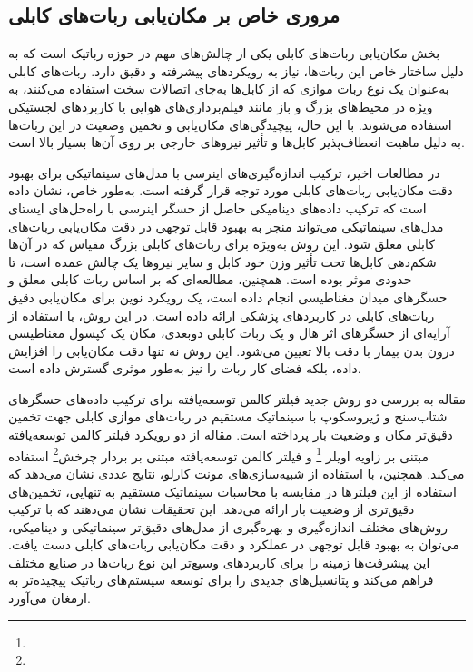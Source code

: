 \subsection{مروری خاص بر مکان‌یابی ربات‌های کابلی}

بخش مکان‌یابی ربات‌های کابلی یکی از چالش‌های مهم در حوزه رباتیک است که به دلیل ساختار خاص این ربات‌ها، نیاز به رویکردهای پیشرفته و دقیق دارد. ربات‌های کابلی به‌عنوان یک نوع ربات موازی که از کابل‌ها به‌جای اتصالات سخت استفاده می‌کنند، به ویژه در محیط‌های بزرگ و باز مانند فیلم‌برداری‌های هوایی یا کاربردهای لجستیکی استفاده می‌شوند. با این حال، پیچیدگی‌های مکان‌یابی و تخمین وضعیت در این ربات‌ها به دلیل ماهیت انعطاف‌پذیر کابل‌ها و تأثیر نیروهای خارجی بر روی آن‌ها بسیار بالا است.

در مطالعات اخیر، ترکیب اندازه‌گیری‌های اینرسی با مدل‌های سینماتیکی برای بهبود دقت مکان‌یابی ربات‌های کابلی مورد توجه قرار گرفته است. به‌طور خاص، 
\cite{murtra2013imu}
نشان داده است که ترکیب داده‌های دینامیکی حاصل از حسگر اینرسی با راه‌حل‌های ایستای مدل‌های سینماتیکی می‌تواند منجر به بهبود قابل توجهی در دقت مکان‌یابی ربات‌های کابلی معلق شود. این روش به‌ویژه برای ربات‌های کابلی بزرگ مقیاس که در آن‌ها شکم‌دهی کابل‌ها تحت تأثیر وزن خود کابل و سایر نیروها یک چالش عمده است، تا حدودی موثر بوده است. همچنین،
\cite{kim2020robotic}
مطالعه‌ای که بر اساس ربات کابلی معلق و حسگرهای میدان مغناطیسی انجام داده است، یک رویکرد نوین برای مکان‌یابی دقیق ربات‌های کابلی در کاربردهای پزشکی ارائه داده است. در این روش، با استفاده از آرایه‌ای از حسگرهای اثر هال و یک ربات کابلی دوبعدی، مکان یک کپسول مغناطیسی درون بدن بیمار با دقت بالا تعیین می‌شود. این روش نه تنها دقت مکان‌یابی را افزایش داده، بلکه فضای کار ربات را نیز به‌طور موثری گسترش داده است.

مقاله
\cite{le2021cable}
 به بررسی دو روش جدید فیلتر کالمن توسعه‌یافته برای ترکیب داده‌های حسگرهای شتاب‌سنج و ژیروسکوپ با سینماتیک مستقیم در ربات‌های موازی کابلی جهت تخمین دقیق‌تر مکان و وضعیت بار پرداخته است. مقاله از دو رویکرد فیلتر کالمن توسعه‌یافته مبتنی بر زاویه اویلر
 \footnote{}
  و فیلتر کالمن توسعه‌یافته مبتنی بر بردار چرخش\footnote{} استفاده می‌کند. همچنین، با استفاده از شبیه‌سازی‌های مونت کارلو، نتایج عددی نشان می‌دهد که استفاده از این فیلترها در مقایسه با محاسبات سینماتیک مستقیم به تنهایی، تخمین‌های دقیق‌تری از وضعیت بار ارائه می‌دهد. این تحقیقات نشان می‌دهند که با ترکیب روش‌های مختلف اندازه‌گیری و بهره‌گیری از مدل‌های دقیق‌تر سینماتیکی و دینامیکی، می‌توان به بهبود قابل توجهی در عملکرد و دقت مکان‌یابی ربات‌های کابلی دست یافت. این پیشرفت‌ها زمینه را برای کاربردهای وسیع‌تر این نوع ربات‌ها در صنایع مختلف فراهم می‌کند و پتانسیل‌های جدیدی را برای توسعه سیستم‌های رباتیک پیچیده‌تر به ارمغان می‌آورد.

